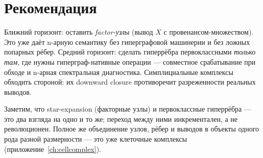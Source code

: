 \section{Рекомендация}

\begin{principle}
Ближний горизонт: оставить \emph{factor-узлы} (вывод $X$ с провенансом-множеством).
Это уже даёт n-арную семантику без гиперграфовой машинерии и без ложных попарных
рёбер. Средний горизонт: сделать гиперрёбра первоклассными \emph{только там}, где
нужны гиперграф-нативные операции — совместное срабатывание при обходе и n-арная
спектральная диагностика. Симплициальные комплексы обходить стороной: их downward
closure противоречит разреженности реальных выводов.
\end{principle}

Заметим, что star-expansion (факторные узлы) и первоклассные гиперрёбра — это два
взгляда на одно и то же; переход между ними инкрементален, а не революционен.
Полное же объединение узлов, рёбер и выводов в объекты одного рода разной
размерности — это уже клеточные комплексы (приложение~\ref{ch:cellcomplex}).
